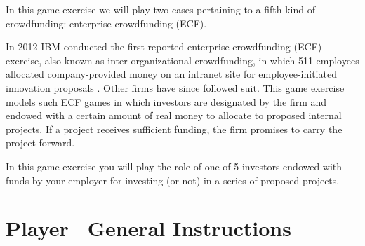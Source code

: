\documentclass[11pt, oneside]{article}   	%
\begin{document}
In this game exercise we will play two cases pertaining to a fifth kind of crowdfunding: enterprise crowdfunding (ECF).

In 2012 IBM conducted the first reported enterprise crowdfunding (ECF) exercise, also known as inter-organizational crowdfunding, in which 511 employees allocated company-provided money on an intranet site for employee-initiated innovation proposals \citep{muller_etal_2013}. Other firms have since followed suit. This game exercise models such ECF games in which investors are designated by the firm and endowed with a certain amount of real money to allocate to proposed internal projects. If a project receives sufficient funding, the firm promises to carry the project forward.

In this game exercise you will play the role of one of 5 investors endowed with funds by your employer for investing (or not) in a series of proposed projects.



	



\section{Player \theplayer\ General Instructions}
\end{document}
